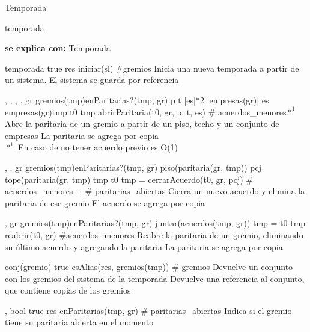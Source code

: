 \begin{interfaz}{Temporada}

\begin{iparamformales}{temporada}

\textbf{\large se explica con:} Temporada

\end{iparamformales}

{}{temporada}
{true}
{res \igobs iniciar(sl)}
{\#gremios}
{Inicia una nueva temporada a partir de un sistema.}
{El sistema se guarda por referencia}

{, , , , }{}
{gr \in gremios(tmp)\ly \neg enParitarias?(tmp, gr) \ly p \leq t \ly |es|*2 \leq |empresas(gr)| \ly es \subseteq empresas(gr)\ly tmp \igobs t0 }
{tmp \igobs abrirParitaria(t0, gr, p, t, es)  }
{\# acuerdos\_menores$*^1$}
{Abre la paritaria de un gremio a partir de un piso, techo y un conjunto de empresas}
{La paritaria se agrega por copia \\
$*^1$ En caso de no tener acuerdo previo es O(1)}

{,  ,  }{}
{ gr \in gremios(tmp)\lyl enParitarias?(tmp, gr) \ly piso(paritaria(gr, tmp)) \leq pcj \leq tope(paritaria(gr, tmp) \ly tmp \igobs t0 }
{tmp = cerrarAcuerdo(t0, gr, pcj)}
{ \# acuerdos\_menores + \# paritarias\_abiertas}
{Cierra un nuevo acuerdo y elimina la paritaria de ese gremio}
{El acuerdo se agrega por copia}

{, }{}
{gr \in gremios(tmp)\ly \neg enParitarias?(tmp, gr) \ly \emptyset \neq  juntar(acuerdos(tmp, gr)) \ly tmp = t0 }
{tmp \igobs reabrir(t0, gr) }
{\#acuerdos\_menores}
{Reabre la paritaria de un gremio, eliminando su último acuerdo y agregando la paritaria}
{La paritaria se agrega por copia}

{}{conj(gremio)}
{true}
{ esAlias(res, gremios(tmp)) }
{ \# gremios }
{Devuelve un conjunto con los gremios del sistema de la temporada}
{Devuelve una referencia al conjunto, que contiene copias de los gremios}

{, }{bool}
{true}
{ res \igobs enParitarias(tmp, gr) }
{\# paritarias\_abiertas}
{Indica si el gremio tiene su paritaria abierta en el momento}
{}


\end{interfaz}
